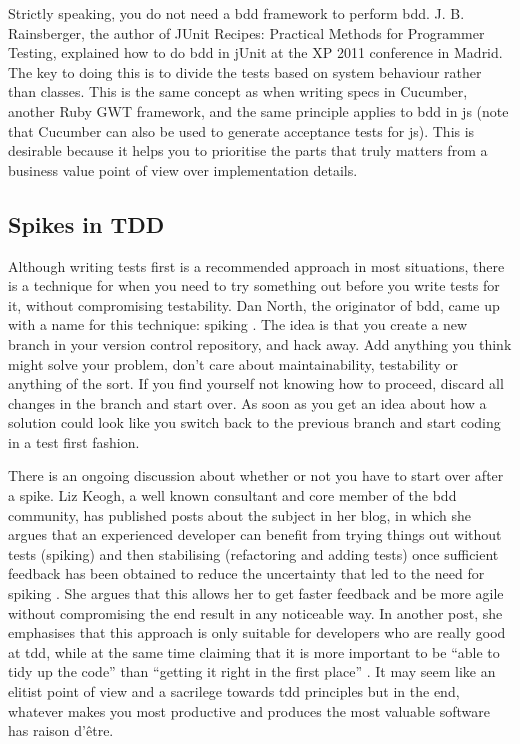 \documentclass[11pt]{article}
\begin{document}
Strictly speaking, you do not need a \gls{bdd} framework to perform \gls{bdd}. J. B. Rainsberger, the author of JUnit Recipes: Practical Methods for Programmer Testing, explained how to do \gls{bdd} in jUnit at the XP 2011 conference in Madrid. The key to doing this is to divide the tests based on system behaviour rather than classes. This is the same concept as when writing \glspl{spec} in Cucumber, another Ruby GWT framework, and the same principle applies to \gls{bdd} in \gls{js} (note that Cucumber can also be used to generate acceptance tests for \gls{js}). This is desirable because it helps you to prioritise the parts that truly matters from a business value point of view over implementation details. \cite[question~20]{Ahnve}

\subsection{Spikes in TDD}
\label{subsec:spikes}

Although writing tests first is a recommended approach in most situations, there is a technique for when you need to try something out before you write tests for it, without compromising testability. Dan North, the originator of \gls{bdd}, came up with a name for this technique: spiking \cite{TwitterDanNorth}. The idea is that you create a new branch in your version control repository, and hack away. Add anything you think might solve your problem, don't care about maintainability, testability or anything of the sort. If you find yourself not knowing how to proceed, discard all changes in the branch and start over. As soon as you get an idea about how a solution could look like you switch back to the previous branch and start coding in a test first fashion. \cite[question~59]{Edelstam}

There is an ongoing discussion about whether or not you have to start over after a spike. Liz Keogh, a well known consultant and core member of the \gls{bdd} community, has published posts about the subject in her blog, in which she argues that an experienced developer can benefit from trying things out without tests (spiking) and then stabilising (refactoring and adding tests) once sufficient feedback has been obtained to reduce the uncertainty that led to the need for spiking \cite{Liz1}. She argues that this allows her to get faster feedback and be more agile without compromising the end result in any noticeable way. In another post, she emphasises that this approach is only suitable for developers who are really good at \gls{tdd}, while at the same time claiming that it is more important to be ``able to tidy up the code'' than ``getting it right in the first place'' \cite{Liz2}. It may seem like an elitist point of view and a sacrilege towards \gls{tdd} principles but in the end, whatever makes you most productive and produces the most valuable software has raison d'être.
\end{document}
